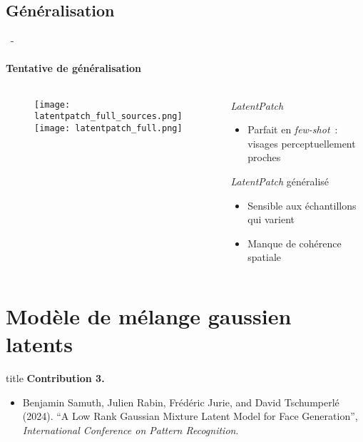 \documentclass[aspectratio=169, 22pt]{beamer}
\begin{document}
\subsection{Généralisation}
\begin{frame}{\secname~- \subsecname}
  \framesubtitle{Tentative de généralisation}
  \begin{columns}
    \begin{column}{0.5\linewidth}
      \begin{figure}
        \centering
        \texttt{[image: latentpatch\_full\_sources.png]}
        \texttt{[image: latentpatch\_full.png]}
      \end{figure}
    \end{column}
    \begin{column}{0.5\linewidth}
      \begin{exampleblock}{\emph{LatentPatch}}
        \begin{itemize}
        \item Parfait en \emph{few-shot} : visages perceptuellement proches
        \end{itemize}
      \end{exampleblock}
      \begin{alertblock}{\emph{LatentPatch} généralisé}
        \begin{itemize}
        \item Sensible aux échantillons qui varient
        \item Manque de cohérence spatiale
        \end{itemize}
      \end{alertblock}
    \end{column}
  \end{columns}
\end{frame}

\section{Modèle de mélange gaussien latents}

\begin{frame}
  \vfill
  \begin{beamercolorbox}[sep=15pt,center,shadow=true,rounded=true]{title}
    \LARGE\bfseries Contribution 3. \\ \secname
  \end{beamercolorbox}
  \vfill
  \begin{itemize}
    \item \footnotesize Benjamin Samuth, Julien Rabin, Frédéric Jurie, and David
      Tschumperlé (2024). ``A Low Rank Gaussian Mixture Latent Model for
      Face Generation'', \emph{International Conference on Pattern
        Recognition}.
  \end{itemize}
\end{frame}
\end{document}

